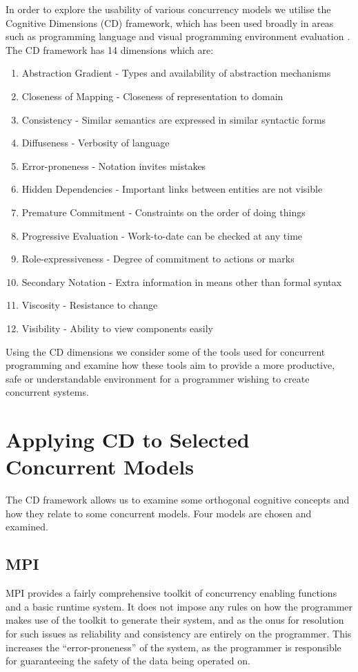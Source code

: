 \documentclass{sig-alternate}
\begin{document}
In order to explore the usability of various concurrency models we utilise the Cognitive Dimensions \cite{green89:_cognit_dimen_notat} (CD) framework, which has been used broadly in areas such as programming language \cite{enpl} and visual programming environment evaluation \cite{cdf}. The CD framework has 14 dimensions which are:

\begin{enumerate}
\item Abstraction Gradient - Types and availability of abstraction mechanisms
\item Closeness of Mapping - Closeness of representation to domain
\item Consistency - Similar semantics are expressed in similar syntactic forms
\item Diffuseness - Verbosity of language
\item Error-proneness - Notation invites mistakes
\item Hidden Dependencies - Important links between entities are not visible
\item Premature Commitment - Constraints on the order of doing things
\item Progressive Evaluation - Work-to-date can be checked at any time
\item Role-expressiveness - Degree of commitment to actions or marks
\item Secondary Notation - Extra information in means other than formal syntax
\item Viscosity - Resistance to change
\item Visibility - Ability to view components easily
\end{enumerate}

Using the CD dimensions we consider some of the tools used for concurrent programming and examine how these tools aim to provide a more productive, safe or understandable environment for a programmer wishing to create concurrent systems.

\section{Applying CD to Selected Concurrent Models}
The CD framework allows us to examine some orthogonal cognitive concepts and how they relate to some concurrent models. Four models are chosen and examined.

\subsection{MPI}
MPI provides a fairly comprehensive toolkit of concurrency enabling functions and a basic runtime system. It does not impose any rules on how the programmer makes use of the toolkit to generate their system, and as the onus for resolution for such issues as reliability and consistency are entirely on the programmer. This increases the ``error-proneness'' of the system, as the programmer is responsible for guaranteeing the safety of the data being operated on.
\end{document}
